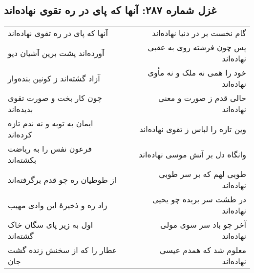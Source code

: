 \begin{center}
\section*{غزل شماره ۲۸۷: آنها که پای در ره تقوی نهاده‌اند}
\label{sec:287}
\begin{longtable}{l p{0.5cm} r}
آنها که پای در ره تقوی نهاده‌اند
&&
گام نخست بر در دنیا نهاده‌اند
\\
آورده‌اند پشت برین آشیان دیو
&&
پس چون فرشته روی به عقبی نهاده‌اند
\\
آزاد گشته‌اند ز کونین بنده‌وار
&&
خود را همی نه ملک و نه مأوی نهاده‌اند
\\
چون کار بخت و صورت تقوی بدیده‌اند
&&
حالی قدم ز صورت و معنی نهاده‌اند
\\
ایمان به توبه و نه ندم تازه کرده‌اند
&&
وین تازه را لباس ز تقوی نهاده‌اند
\\
فرعون نفس را به ریاضت بکشته‌اند
&&
وانگاه دل بر آتش موسی نهاده‌اند
\\
از طوطیان ره چو قدم برگرفته‌اند
&&
طوبی لهم که بر سر طوبی نهاده‌اند
\\
زاد ره و ذخیرهٔ این وادی مهیب
&&
در طشت سر بریده چو یحیی نهاده‌اند
\\
اول به زیر پای سگان خاک گشته‌اند
&&
آخر چو باد سر سوی مولی نهاده‌اند
\\
عطار را که از سخنش زنده گشت جان
&&
معلوم شد که همدم عیسی نهاده‌اند
\\
\end{longtable}
\end{center}
